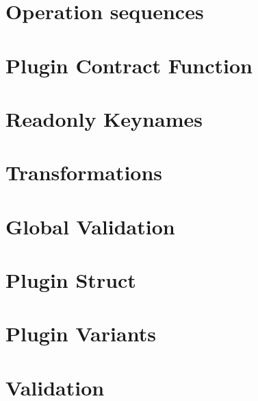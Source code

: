 \let\mypdfximage\pdfximage\def\pdfximage{\immediate\mypdfximage}\documentclass[twoside]{book}
\newcommand{\+}{\discretionary{\mbox{\scriptsize$\hookleftarrow$}}{}{}}
\begin{document}
\chapter{Operation sequences}
\label{doc_decisions_0_drafts_operation_sequences_md}

\chapter{Plugin Contract Function}
\label{doc_decisions_0_drafts_plugin_contract_function_md}

\chapter{Readonly Keynames}
\label{doc_decisions_0_drafts_readonly_keynames_md}

\chapter{Transformations}
\label{doc_decisions_0_drafts_transformations_md}

\chapter{Global Validation}
\label{doc_decisions_0a_postponed_global_validation_md}

\chapter{Plugin Struct}
\label{doc_decisions_0a_postponed_plugin_struct_md}

\chapter{Plugin Variants}
\label{doc_decisions_0a_postponed_plugin_variants_md}

\chapter{Validation}
\label{doc_decisions_0a_postponed_validation_md}

\end{document}

